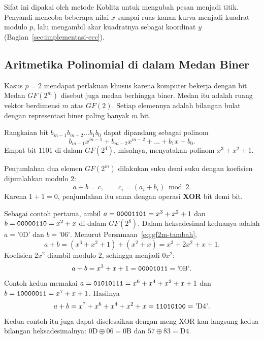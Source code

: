 Sifat ini dipakai oleh metode Koblitz untuk mengubah pesan menjadi titik.
Penyandi mencoba beberapa nilai $x$ sampai ruas kanan kurva menjadi kuadrat
modulo $p$, lalu mengambil akar kuadratnya sebagai koordinat $y$
(Bagian~\ref{sec:implementasi-ecc}).

\subsection{Aritmetika Polinomial di dalam Medan Biner}
\label{subsec:gf-2m}

Kasus $p = 2$ mendapat perlakuan khusus karena komputer bekerja dengan bit.
Medan $GF(2^m)$ disebut juga medan berhingga biner. Medan itu adalah ruang
vektor berdimensi $m$ atas $GF(2)$. Setiap elemennya adalah bilangan bulat
dengan representasi biner paling banyak $m$ bit.


Rangkaian bit $b_{m-1}b_{m-2}\dots b_1b_0$ dapat dipandang sebagai polinom
\begin{equation}
b_{m-1}x^{m-1} + b_{m-2}x^{m-2} + \dots + b_1x + b_0 .
\label{eq:gf2m-polinom}
\end{equation}
Empat bit $1101$ di dalam $GF(2^4)$, misalnya, menyatakan polinom
$x^3 + x^2 + 1$.

Penjumlahan dua elemen $GF(2^m)$ dilakukan suku demi suku dengan koefisien
dijumlahkan modulo $2$:
\begin{equation}
a + b = c, \qquad c_i = (a_i + b_i) \bmod 2 .
\label{eq:gf2m-tambah}
\end{equation}
Karena $1 + 1 = 0$, penjumlahan itu sama dengan operasi \textbf{XOR} bit demi
bit.

Sebagai contoh pertama, ambil $a = \texttt{00001101} = x^3 + x^2 + 1$ dan
$b = \texttt{00000110} = x^2 + x$ di dalam $GF(2^8)$. Dalam heksadesimal keduanya
adalah $a = \text{'0D'}$ dan $b = \text{'06'}$. Menurut
Persamaan~\eqref{eq:gf2m-tambah},
\[
a + b = (x^3 + x^2 + 1) + (x^2 + x) = x^3 + 2x^2 + x + 1 .
\]
Koefisien $2x^2$ diambil modulo $2$, sehingga menjadi $0x^2$:
\[
a + b = x^3 + x + 1 = \texttt{00001011} = \text{'0B'} .
\]
Contoh kedua memakai $a = \texttt{01010111} = x^6 + x^4 + x^2 + x + 1$ dan
$b = \texttt{10000011} = x^7 + x + 1$. Hasilnya
\[
a + b = x^7 + x^6 + x^4 + x^2 + x = \texttt{11010100} = \text{'D4'} .
\]
Kedua contoh itu juga dapat diselesaikan dengan meng-XOR-kan langsung kedua
bilangan heksadesimalnya: $0\text{D} \oplus 06 = 0\text{B}$ dan
$57 \oplus 83 = \text{D4}$.

